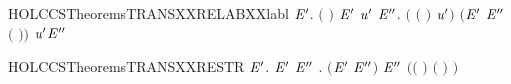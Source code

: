 \begin{SaveVerbatim}{HOLCCSTheoremsTRANSXXRELABXXlabl}
\HOLTokenTurnstile{} \HOLSymConst{\HOLTokenForall{}}   \ensuremath{\HOLBoundVar{E}\sp{\prime{}}}.
       \ensuremath{(} \ensuremath{)} \HOLTokenTransBegin{}\HOLTokenTransEnd \ensuremath{\HOLBoundVar{E}\sp{\prime{}}} \HOLSymConst{\HOLTokenImp{}}
     \HOLSymConst{\HOLTokenExists{}}\ensuremath{\HOLBoundVar{u}\sp{\prime{}}} \ensuremath{\HOLBoundVar{E}\sp{\prime{}\prime{}}}.
       \ensuremath{(} \HOLSymConst{\ensuremath{=}}  \ensuremath{(} \ensuremath{)} \ensuremath{\HOLBoundVar{u}\sp{\prime{}}}\ensuremath{)} \HOLSymConst{\HOLTokenConj{}}
       \ensuremath{(}\ensuremath{\HOLBoundVar{E}\sp{\prime{}}} \HOLSymConst{\ensuremath{=}}  \ensuremath{\HOLBoundVar{E}\sp{\prime{}\prime{}}} \ensuremath{(} \ensuremath{)}\ensuremath{)} \HOLSymConst{\HOLTokenConj{}}  \HOLTokenTransBegin\ensuremath{\HOLBoundVar{u}\sp{\prime{}}}\HOLTokenTransEnd \ensuremath{\HOLBoundVar{E}\sp{\prime{}\prime{}}}
\end{SaveVerbatim}
\newcommand{\HOLCCSTheoremsTRANSXXRELABXXlabl}{\UseVerbatim{HOLCCSTheoremsTRANSXXRELABXXlabl}}
\begin{SaveVerbatim}{HOLCCSTheoremsTRANSXXRESTR}
\HOLTokenTurnstile{} \HOLSymConst{\HOLTokenForall{}}   \ensuremath{\HOLBoundVar{E}\sp{\prime{}}}.
        \HOLTokenTransBegin{}\HOLTokenTransEnd \ensuremath{\HOLBoundVar{E}\sp{\prime{}}} \HOLSymConst{\HOLTokenImp{}}
     \HOLSymConst{\HOLTokenExists{}}\ensuremath{\HOLBoundVar{E}\sp{\prime{}\prime{}}} .
       \ensuremath{(}\ensuremath{\HOLBoundVar{E}\sp{\prime{}}} \HOLSymConst{\ensuremath{=}}   \ensuremath{\HOLBoundVar{E}\sp{\prime{}\prime{}}}\ensuremath{)} \HOLSymConst{\HOLTokenConj{}}  \HOLTokenTransBegin{}\HOLTokenTransEnd \ensuremath{\HOLBoundVar{E}\sp{\prime{}\prime{}}} \HOLSymConst{\HOLTokenConj{}}
       \ensuremath{(}\ensuremath{(} \HOLSymConst{\ensuremath{=}} \HOLConst{\ensuremath{\tau}}\ensuremath{)} \HOLSymConst{\HOLTokenDisj{}} \ensuremath{(} \HOLSymConst{\ensuremath{=}}  \ensuremath{)} \HOLSymConst{\HOLTokenConj{}}  \HOLConst{\HOLTokenNotIn{}}  \HOLSymConst{\HOLTokenConj{}}   \HOLConst{\HOLTokenNotIn{}} \ensuremath{)}
\end{SaveVerbatim}
